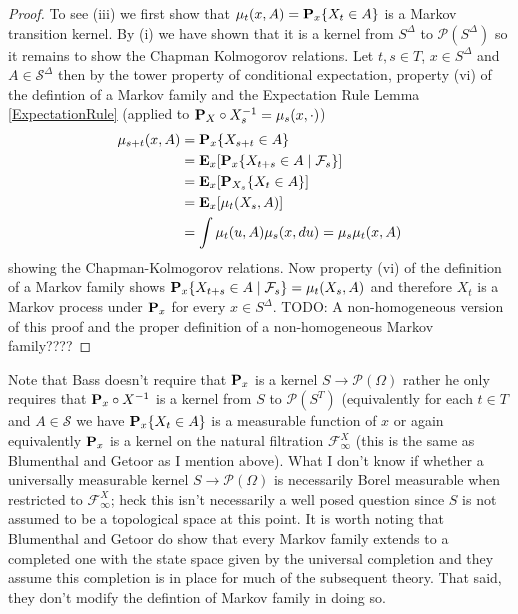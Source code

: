 \begin{proof}
To see (iii) we first show that $\mu_t(x,A) = \sprobability{X_t \in A}{x}$ is a Markov transition kernel.  By (i) we have shown that it is a kernel from $S^\Delta$ to $\mathcal{P}(S^\Delta)$ so it remains to show the Chapman Kolmogorov relations.  Let $t,s \in T$, $x \in S^\Delta$ and $A \in \mathcal{S}^\Delta$ then by the tower property of conditional expectation, property (vi) of the defintion of a Markov family and the Expectation Rule Lemma \ref{ExpectationRule} (applied to $\pushforward{X_s}{\probabilityop_X} = \mu_s(x, \cdot)$)
\begin{align*}
\mu_{s+t}(x, A) &= \sprobability{X_{s+t} \in A}{x} \\
&=\sexpectation{\csprobability{\mathcal{F}_s}{X_{t+s} \in A}{x}}{x} \\
&=\sexpectation{\sprobability{X_{t} \in A}{X_s}}{x} \\
&=\sexpectation{\mu_t(X_s, A)}{x} \\
&=\int \mu_t(u, A) \mu_s(x, du) = \mu_s \mu_t (x, A) \\
\end{align*}
showing the Chapman-Kolmogorov relations.  Now property (vi) of the definition of a Markov family shows $\csprobability{\mathcal{F}_s}{X_{t+s} \in A}{x} = \mu_t(X_s,A)$ and
therefore $X_t$ is a Markov process under $\probabilityop_x$ for every $x \in S^\Delta$.
TODO: A non-homogeneous version of this proof and the proper definition of a non-homogeneous Markov family????
\end{proof}

Note that Bass doesn't require that $\probabilityop_x$ is a kernel $S
\to \mathcal{P}(\Omega)$ rather he only requires that
$\pushforward{X}{\probabilityop_x}$ is a kernel from $S$ to
$\mathcal{P}(S^T)$ (equivalently for each $t \in T$ and $A \in \mathcal{S}$ we have
$\sprobability{X_t \in A}{x}$ is a measurable function of $x$ or again
equivalently $\probabilityop_x$ is a kernel on the natural filtration
$\mathcal{F}^X_\infty$ (this is the same as Blumenthal and Getoor as I mention above).  What I don't know if whether a universally
measurable kernel $S \to  \mathcal{P}(\Omega)$ is necessarily Borel
measurable when restricted to $\mathcal{F}^X_\infty$; heck this isn't necessarily a well posed question since $S$ is not assumed to be
a topological space at this point.  It is worth noting that Blumenthal and Getoor do show that every Markov family extends to a completed one with 
the state space given by the universal completion and they assume this completion is in place for much of the subsequent theory.  That said, they
don't modify the defintion of Markov family in doing so.

